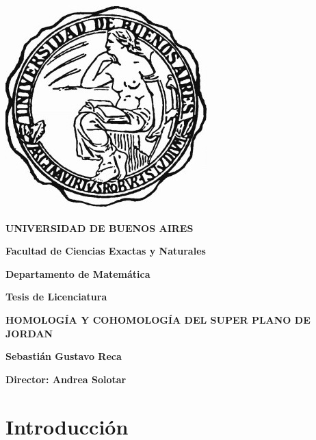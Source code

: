 \documentclass[a4paper,oneside,fleqn,11pt]{report}
\date{23/03/2015}
\theoremstyle{definition}
\theoremstyle{definition}
\theoremstyle{definition}
\begin{document}
\begin {center}

\includegraphics[scale=.3]{uba2.jpg}

\medskip
\textbf{UNIVERSIDAD DE BUENOS AIRES}

\smallskip

\textbf{Facultad de Ciencias Exactas y Naturales}

\smallskip

\textbf{Departamento de Matem\'atica}

\vspace{3.5cm}

\textbf{\large Tesis de Licenciatura}


\vspace{1.5cm}

\textbf{\large HOMOLOGÍA Y COHOMOLOGÍA DEL SUPER PLANO DE JORDAN}

\vspace{1.5cm}


\textbf{Sebastián Gustavo Reca}

\end {center}


\vspace{1.5cm}

\noindent \textbf{Director: Andrea Solotar} \ 


\vspace{3cm}


\tableofcontents

\chapter*{Introducción}
\label{introduccion}

\end{document}
